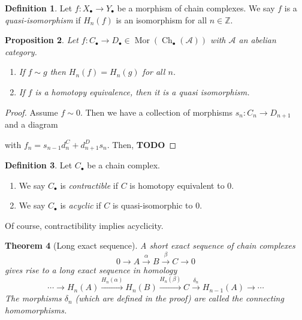 \documentclass{article}
\newcommand{\Z}{\mathbb{Z}}
\newcommand{\Acat}{\mathcal{A}}
\DeclareMathOperator{\Ch}{Ch}
\DeclareMathOperator{\Mor}{Mor}
\newcommand{\todo}{\textbf{TODO}}
\theoremstyle{plain}
\newtheorem{theorem}{Theorem}[section]
\newtheorem{proposition}[theorem]{Proposition}
\theoremstyle{definition}
\newtheorem{definition}[theorem]{Definition}
\theoremstyle{remark}
\begin{document}
\begin{definition}
    Let $f : X_\bullet \to Y_\bullet$ be a morphism of chain complexes. We say $f$ is a \emph{quasi-isomorphism} if $H_n(f)$ is an isomorphism for all $n \in \Z$.
\end{definition}

\begin{proposition}
    Let $f : C_\bullet \to D_\bullet \in \Mor(\Ch_\bullet (\Acat))$ with $\Acat$ an abelian category.
    \begin{enumerate}
        \item If $f \sim g$ then $H_n(f) = H_n(g)$ for all $n$.
        \item If $f$ is a homotopy equivalence, then it is a quasi isomorphism.
    \end{enumerate}
\end{proposition}

\begin{proof}
    Assume $f \sim 0$. Then we have a collection of morphisms $s_n : C_n \to D_{n+1}$ and a diagram
    \begin{center}
    \end{center}
    with $f_n = s_{n-1} d_n^C + d_{n+1}^D s_n$. Then, \todo
\end{proof}

\begin{definition}
    Let $C_\bullet$ be a chain complex.
    \begin{enumerate}
        \item We say $C_\bullet$ is \emph{contractible} if $C$ is homotopy equivalent to $0$.
        \item We say $C_\bullet$ is \emph{acyclic} if $C$ is quasi-isomorphic to $0$.
    \end{enumerate}
\end{definition}

Of course, contractibility implies acyclicity.

\begin{theorem}[Long exact sequence]
    A short exact sequence of chain complexes
    \[0 \to A \xrightarrow{\alpha} B \xrightarrow{\beta} C \to 0\]
    gives rise to a long exact sequence in homology
    \[\cdots \to H_n(A) \xrightarrow{H_n (\alpha)} H_n(B) \xrightarrow{H_n(\beta)} C \xrightarrow{\delta_n} H_{n-1}(A) \to \cdots\]
    The morphisms $\delta_n$ (which are defined in the proof) are called the \emph{connecting} homomorphisms.
\end{theorem}
\end{document}
